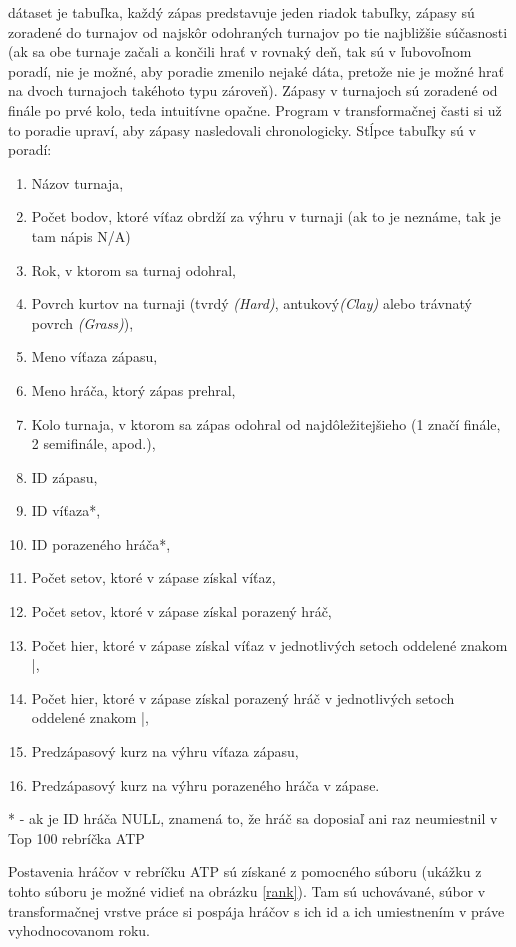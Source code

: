 dátaset je tabuľka, každý zápas predstavuje jeden riadok tabuľky, zápasy sú zoradené do turnajov od najskôr odohraných turnajov po tie najbližšie súčasnosti (ak sa obe turnaje začali a končili hrať v rovnaký deň, tak sú v ľubovoľnom poradí, nie je možné, aby poradie zmenilo nejaké dáta, pretože nie je možné hrať na dvoch turnajoch takéhoto typu zároveň). 
Zápasy v turnajoch sú zoradené od finále po prvé kolo, teda intuitívne opačne. Program v transformačnej časti si už to poradie upraví, aby zápasy nasledovali chronologicky. 
Stĺpce tabuľky sú v poradí:
\begin{enumerate}
  \item Názov turnaja,
  \item Počet bodov, ktoré víťaz obrdží za výhru v turnaji (ak to je neznáme, tak je tam nápis N/A)
  \item Rok, v ktorom sa turnaj odohral,
  \item Povrch kurtov na turnaji (tvrdý \textit{(Hard)}, antukový\textit{(Clay)} alebo trávnatý povrch \textit{(Grass)}),
  \item Meno víťaza zápasu,
  \item Meno hráča, ktorý zápas prehral,
  \item Kolo turnaja, v ktorom sa zápas odohral od najdôležitejšieho (1 značí finále, 2 semifinále, apod.),
  \item ID zápasu,
  \item ID víťaza*,
  \item ID porazeného hráča*,
  \item Počet setov, ktoré v zápase získal víťaz,
  \item Počet setov, ktoré v zápase získal porazený hráč,
  \item Počet hier, ktoré v zápase získal víťaz v jednotlivých setoch oddelené znakom |,
  \item Počet hier, ktoré v zápase získal porazený hráč v jednotlivých setoch oddelené znakom |,
  \item Predzápasový kurz na výhru víťaza zápasu,
  \item Predzápasový kurz na výhru porazeného hráča v zápase.
\end{enumerate}
* - ak je ID hráča NULL, znamená to, že hráč sa doposiaľ ani raz neumiestnil v Top 100 rebríčka ATP

Postavenia hráčov v rebríčku ATP sú získané z pomocného súboru (ukážku z tohto súboru je možné vidieť na obrázku \ref{rank}). Tam sú uchovávané, súbor v transformačnej vrstve práce si pospája hráčov s ich id a ich umiestnením v práve vyhodnocovanom roku.

